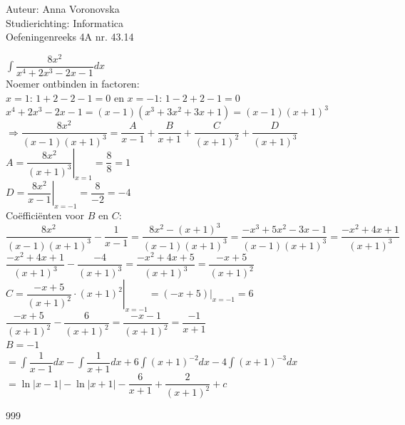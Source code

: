 \documentclass[a4paper]{article}
\begin{document}
  
\noindent \large Auteur: Anna Voronovska \\
\noindent \large Studierichting: Informatica\\
\noindent \large Oefeningenreeks 4A nr. 43.14\\

\medskip

\normalsize

$\displaystyle\int\dfrac{8x^2}{x^4+2x^3-2x-1}dx$\\

Noemer ontbinden in factoren:\\

$x=1$: $1+2-2-1=0$ en $x=-1$: $1-2+2-1=0$\\

$x^4+2x^3-2x-1 = (x-1)(x^3+3x^2+3x+1) = (x-1)(x+1)^3$\\

$\Rightarrow \dfrac{8x^2}{(x-1)(x+1)^3} = \dfrac{A}{x-1}+\dfrac{B}{x+1}+\dfrac{C}{(x+1)^2}+\dfrac{D}{(x+1)^3}$\\

$A = \left.\dfrac{8x^2}{(x+1)^3}\right|_{x=1} = \dfrac{8}{8} = 1$\\

$D = \left.\dfrac{8x^2}{x-1}\right|_{x=-1} = \dfrac{8}{-2} = -4$\\

Coëfficiënten voor $B$ en $C$:\\

$\dfrac{8x^2}{(x-1)(x+1)^3} - \dfrac{1}{x-1} 
= \dfrac{8x^2-(x+1)^3}{(x-1)(x+1)^3} 
= \dfrac{-x^3+5x^2-3x-1}{(x-1)(x+1)^3} 
= \dfrac{-x^2+4x+1}{(x+1)^3}$\\

$\dfrac{-x^2+4x+1}{(x+1)^3} - \dfrac{-4}{(x+1)^3} 
= \dfrac{-x^2+4x+5}{(x+1)^3} 
= \dfrac{-x+5}{(x+1)^2}$\\

$C = \left.\dfrac{-x+5}{(x+1)^2}\cdot(x+1)^2\right|_{x=-1} = \left.(-x+5)\right|_{x=-1} = 6$\\

$\dfrac{-x+5}{(x+1)^2} - \dfrac{6}{(x+1)^2} 
= \dfrac{-x-1}{(x+1)^2} 
= \dfrac{-1}{x+1}$\\

$B = -1$\\

$= \displaystyle\int\dfrac{1}{x-1}dx - \displaystyle\int\dfrac{1}{x+1}dx + 6\displaystyle\int(x+1)^{-2}dx - 4\displaystyle\int(x+1)^{-3}dx$\\

$= \ln|x-1| - \ln|x+1| - \dfrac{6}{x+1} + \dfrac{2}{(x+1)^2} + c$\\

\begin{thebibliography}{999}
\end{thebibliography}
\end{document}
